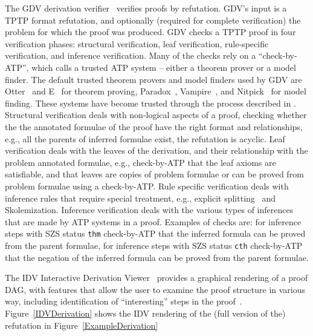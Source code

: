 \documentclass[runningheads]{llncs}
\newcommand{\smalltt}[1]{\small \texttt{#1}}
\begin{document}
The GDV derivation verifier~\cite{Sut06} verifies proofs by refutation.
GDV's input is a TPTP format refutation, and optionally (required for complete verification) the 
problem for which the proof was produced.
GDV checks a TPTP proof in four verification phases: structural verification, leaf verification,
rule-specific verification, and inference verification.
Many of the checks rely on a ``check-by-ATP'', which calls a trusted ATP system -- either a theorem 
prover or a model finder.
The default trusted theorem provers and model finders used by GDV are Otter~\cite{McC03-Otter}
and E~\cite{SCV19} for theorem proving, Paradox~\cite{CS18}, Vampire~\cite{KV13}, and
Nitpick~\cite{BN10-ITP} for model finding.
These systems have become trusted through the process described in \cite{SBB25}.
Structural verification deals with non-logical aspects of a proof, checking whether the
the annotated formulae of the proof have the right format and relationships, e.g., all the 
parents of inferred formulae exist, the refutation is acyclic. 
Leaf verification deals with the leaves of the derivation, and their relationship with
the problem annotated formulae, e.g., check-by-ATP that the leaf axioms are satisfiable, and 
that leaves are copies of problem formulae or can be proved from problem formulae using a 
check-by-ATP.
Rule specific verification deals with inference rules that require special treatment, e.g.,
explicit splitting~\cite{Wei01} and Skolemization. 
Inference verification deals with the various types of inferences that are made by ATP
systems in a proof.
Examples of checks are: for inference steps with SZS status {\smalltt{thm}} check-by-ATP that the 
inferred formula can be proved from the parent formulae, for inference steps with SZS status 
{\smalltt{cth}} check-by-ATP that the negation of the inferred formula can be proved from the 
parent formulae.


The IDV Interactive Derivation Viewer~\cite{TPS07} provides a graphical rendering of a proof
DAG, with features that allow the user to examine the proof structure in various way, 
including identification of ``interesting'' steps in the proof~\cite{PGS06}.
Figure~\ref{IDVDerivation} shows the IDV rendering of the (full version of the) refutation in 
Figure~\ref{ExampleDerivation}
\end{document}

